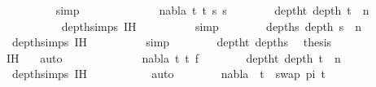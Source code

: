 \begin{isabellebody}
\ \ \ \ \ \ \ \ \isamarkupfalse%
\ simp\isanewline
\ \ \ \ \isamarkupfalse%
\isanewline
\ \ \ \ \ \ \isamarkupfalse%
\ {\isacharparenleft}{\kern0pt}{}\ nabla\ t{}\ t{}\ s{}\ s{}{\isacharparenright}{\kern0pt}\isanewline
\ \ \ \ \ \ \isamarkupfalse%
\ deptht{}{\isacharcolon}{\kern0pt}\ {\isachardoublequoteopen}depth\ t{}\ {\isacharless}{\kern0pt}\ n{\isachardoublequoteclose}\isanewline
\ \ \ \ \ \ \ \ \isamarkupfalse%
\ {}\ depth{\isachardot}{\kern0pt}simps{\isacharparenleft}{\kern0pt}{}{\isacharparenright}{\kern0pt}\ IH\isanewline
\ \ \ \ \ \ \ \ \isamarkupfalse%
\ simp\isanewline
\ \ \ \ \ \ \isamarkupfalse%
\ depths{}{\isacharcolon}{\kern0pt}\ {\isachardoublequoteopen}depth\ s{}\ {\isacharless}{\kern0pt}\ n{\isachardoublequoteclose}\isanewline
\ \ \ \ \ \ \ \ \isamarkupfalse%
\ {}\ depth{\isachardot}{\kern0pt}simps{\isacharparenleft}{\kern0pt}{}{\isacharparenright}{\kern0pt}\ IH\isanewline
\ \ \ \ \ \ \ \ \isamarkupfalse%
\ simp\isanewline
\ \ \ \ \ \ \isamarkupfalse%
\ deptht{}\ depths{}\ \isamarkupfalse%
\ {\isacharquery}{\kern0pt}thesis\ \isanewline
\ \ \ \ \ \ \ \ \isamarkupfalse%
\ {\isachardoublequoteopen}{}{\isachardot}{\kern0pt}IH{\isachardoublequoteclose}\ {}\ \isamarkupfalse%
\ auto\isanewline
\ \ \ \ \isamarkupfalse%
\isanewline
\ \ \ \ \ \ \isamarkupfalse%
\ {\isacharparenleft}{\kern0pt}{}\ nabla\ t{}\ t{}\ f{\isacharparenright}{\kern0pt}\isanewline
\ \ \ \ \ \ \isamarkupfalse%
\ deptht{}{\isacharcolon}{\kern0pt}\ {\isachardoublequoteopen}depth\ t{}\ {\isacharless}{\kern0pt}\ n{\isachardoublequoteclose}\isanewline
\ \ \ \ \ \ \ \ \isamarkupfalse%
\ {}{\isacharparenleft}{\kern0pt}{}{\isacharparenright}{\kern0pt}\ depth{\isachardot}{\kern0pt}simps{\isacharparenleft}{\kern0pt}{}{\isacharparenright}{\kern0pt}\ IH\ \isanewline
\ \ \ \ \ \ \ \ \isamarkupfalse%
\ auto\isanewline
\ \ \ \ \ \ \isamarkupfalse%
\ {\isachardoublequoteopen}nabla\ {\isasymturnstile}\ t{}\ {\isasymapprox}\ swap\ pi\ t{}{\isachardoublequoteclose}\isanewline

\end{isabellebody}
